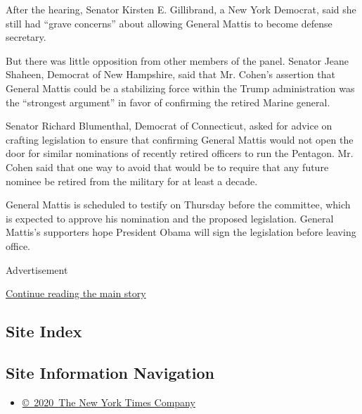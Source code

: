 After the hearing, Senator Kirsten E. Gillibrand, a New York Democrat,
said she still had ``grave concerns'' about allowing General Mattis to
become defense secretary.

But there was little opposition from other members of the panel. Senator
Jeane Shaheen, Democrat of New Hampshire, said that Mr. Cohen's
assertion that General Mattis could be a stabilizing force within the
Trump administration was the ``strongest argument'' in favor of
confirming the retired Marine general.

Senator Richard Blumenthal, Democrat of Connecticut, asked for advice on
crafting legislation to ensure that confirming General Mattis would not
open the door for similar nominations of recently retired officers to
run the Pentagon. Mr. Cohen said that one way to avoid that would be to
require that any future nominee be retired from the military for at
least a decade.

General Mattis is scheduled to testify on Thursday before the committee,
which is expected to approve his nomination and the proposed
legislation. General Mattis's supporters hope President Obama will sign
the legislation before leaving office.

Advertisement

\protect\hyperlink{after-bottom}{Continue reading the main story}

\hypertarget{site-index}{%
\subsection{Site Index}\label{site-index}}

\hypertarget{site-information-navigation}{%
\subsection{Site Information
Navigation}\label{site-information-navigation}}

\begin{itemize}
\tightlist
\item
  \href{https://help.nytimes.com/hc/en-us/articles/115014792127-Copyright-notice}{©~2020~The
  New York Times Company}
\end{itemize}

